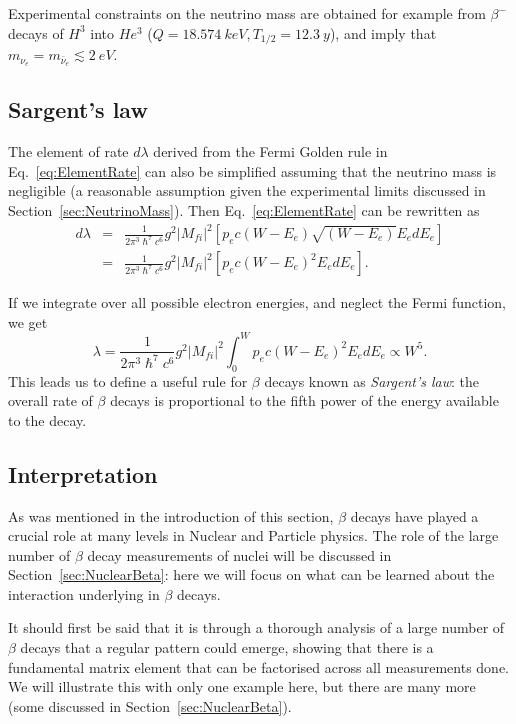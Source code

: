 Experimental constraints on the neutrino mass are obtained for example from \(\beta^-\) decays of \(H^3\) into \(He^3\) (\(Q = \SI{18.574}{keV}, T_{1/2}=\SI{12.3}{y}\)), and imply that \(m_{\nu_e}=m_{\bar{\nu}_e}\lesssim\SI{2}{eV}\).

\subsection{Sargent's law}
The element of rate \(d\lambda\) derived from the Fermi Golden rule in Eq.~\eqref{eq:ElementRate} can also be simplified assuming that the neutrino mass is negligible (a reasonable assumption given the experimental limits discussed in Section~\ref{sec:NeutrinoMass}). Then Eq.~\eqref{eq:ElementRate} can be rewritten as
\begin{eqnarray*}
    d\lambda & =& \frac{1}{2\pi^3\hslash^7 c^6} g^2|M_{fi}|^2 [ p_e c (W - E_e) \sqrt{(W - E_e)} E_e dE_e ] \\ 
    & = & \frac{1}{2\pi^3\hslash^7 c^6} g^2|M_{fi}|^2 \left[ p_e c (W - E_e)^2 E_e dE_e \right].
\end{eqnarray*}

If we integrate over all possible electron energies, and neglect the Fermi function, we get
\begin{equation}
        \lambda = \frac{1}{2\pi^3\hslash^7 c^6} g^2|M_{fi}|^2  \int_0^W  p_e c (W - E_e)^2 E_e dE_e \propto W^5.
\end{equation}
This leads us to define a useful rule for $\beta$ decays known as \emph{Sargent's law}: the overall rate of $\beta$ decays is proportional to the fifth power of the energy available to the decay.

\subsection{Interpretation}
\label{BetaInterpretation}
As was mentioned in the introduction of this section, $\beta$ decays have played a crucial role at many levels in Nuclear and Particle physics. The role of the large number of $\beta$ decay measurements of nuclei will be discussed in Section~\ref{sec:NuclearBeta}: here we will focus on what can be learned about the interaction underlying in $\beta$ decays.

It should first be said that it is through a thorough analysis of a large number of $\beta$ decays that a regular pattern could emerge, showing that there is a fundamental matrix element that can be factorised across all measurements done. We will illustrate this with only one example here, but there are many more (some discussed in Section~\ref{sec:NuclearBeta}).

